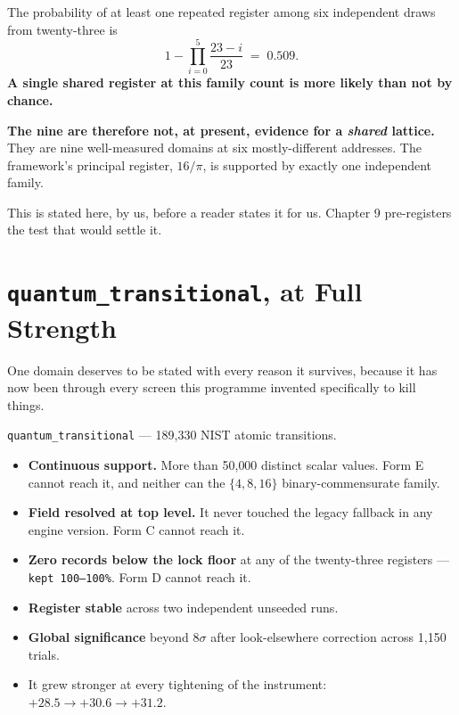 \documentclass[11pt, letterpaper, openany]{book}
\begin{document}
\begin{signalbox}
The probability of at least one repeated register among six independent draws from
twenty-three is
\[
1 - \prod_{i=0}^{5}\frac{23-i}{23} \;=\; \mathbf{0.509}.
\]
\textbf{A single shared register at this family count is more likely than not by chance.}
\end{signalbox}

\begin{warningbox}
\textbf{The nine are therefore not, at present, evidence for a \emph{shared} lattice.} They are
nine well-measured domains at six mostly-different addresses. The framework's principal
register, $16/\pi$, is supported by exactly one independent family.

\medskip
\noindent This is stated here, by us, before a reader states it for us. Chapter 9 pre-registers
the test that would settle it.
\end{warningbox}

\section{\texttt{quantum\_transitional}, at Full Strength}

One domain deserves to be stated with every reason it survives, because it has now been through
every screen this programme invented specifically to kill things.

\begin{signalbox}
\texttt{quantum\_transitional} --- 189{,}330 NIST atomic transitions.

\begin{itemize}
    \item \textbf{Continuous support.} More than 50{,}000 distinct scalar values. Form E cannot
          reach it, and neither can the $\{4,8,16\}$ binary-commensurate family.
    \item \textbf{Field resolved at top level.} It never touched the legacy fallback in any
          engine version. Form C cannot reach it.
    \item \textbf{Zero records below the lock floor} at any of the twenty-three registers ---
          \texttt{kept 100--100\%}. Form D cannot reach it.
    \item \textbf{Register stable} across two independent unseeded runs.
    \item \textbf{Global significance} beyond $8\sigma$ after look-elsewhere correction across
          1{,}150 trials.
    \item It grew stronger at every tightening of the instrument:
          $+28.5 \to +30.6 \to +31.2$.
\end{itemize}
\end{signalbox}
\end{document}
